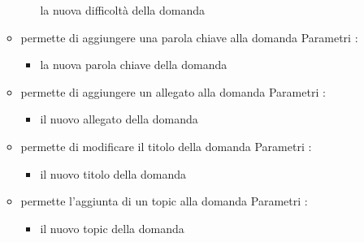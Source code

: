 \begin{itemize}
\begin{itemize}
\begin{itemize}
\newline
la nuova difficoltà della domanda
\end{itemize}
\item {}
\newline
permette di aggiungere una parola chiave alla domanda
\newline
Parametri :
\begin{itemize}
\item {}
\newline
la nuova parola chiave della domanda
\end{itemize}
\item {}
\newline
permette di aggiungere un allegato alla domanda
\newline
Parametri :
\begin{itemize}
\item {}
\newline
il nuovo allegato della domanda
\end{itemize}
\item {}
\newline
permette di modificare il titolo della domanda
\newline
Parametri :
\begin{itemize}
\item {}
\newline
il nuovo titolo della domanda
\end{itemize}
\item {}
\newline
permette l'aggiunta di un topic alla domanda
\newline
Parametri :
\begin{itemize}
\item {}
\newline
il nuovo topic della domanda
\end{itemize}
\end{itemize}
\end{itemize}
